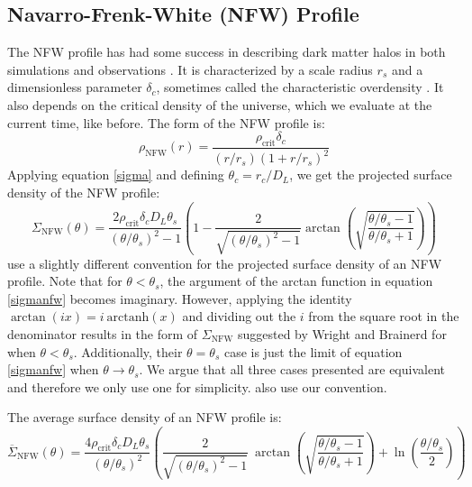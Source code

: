 \documentclass[10pt]{article}
\begin{document}
\subsection{Navarro-Frenk-White (NFW) Profile}
The NFW profile has had some success in describing dark matter halos in both simulations and observations \citep{Navarro1997}. It is characterized by a scale radius $r_s$ and a dimensionless parameter $\delta_c$, sometimes called the characteristic overdensity \citep{Wright2000}. It also depends on the critical density of the universe, which we evaluate at the current time, like before. The form of the NFW profile is:
\begin{equation}
\rho_\mathrm{NFW}(r) = \frac{\rho_\mathrm{crit} \delta_c}{(r/r_s)\left(1 + r/r_s\right)^2}
\end{equation}
Applying equation \ref{sigma} and defining $\theta_c = r_c/D_L$, we get the projected surface density of the NFW profile:
\begin{equation} \label{sigmanfw}
\Sigma_\mathrm{NFW}(\theta) = \frac{2 \rho_\mathrm{crit} \delta_c D_L \theta_s}{(\theta/\theta_s)^2 - 1} \left(1 - \frac{2}{\sqrt{(\theta/\theta_s)^2 - 1}} \arctan\left(\sqrt{\frac{\theta/\theta_s - 1}{\theta/\theta_s + 1}} \right) \right)
\end{equation}
\citet{Wright2000} use a slightly different convention for the projected surface density of an NFW profile. Note that for $\theta < \theta_s$, the argument of the arctan function in equation \ref{sigmanfw} becomes imaginary. However, applying the identity $\arctan(i x) = i\ \mathrm{arctanh}(x)$ and dividing out the $i$ from the square root in the denominator results in the form of $\Sigma_\mathrm{NFW}$ suggested by Wright and Brainerd for when  $\theta < \theta_s$. Additionally, their $\theta = \theta_s$ case is just the limit of equation \ref{sigmanfw} when $\theta \rightarrow \theta_s$. We argue that all three cases presented are equivalent and therefore we only use one for simplicity. \citet{Bartelmann2001} also use our convention.

The average surface density of an NFW profile is:
\begin{equation} \label{sigmabarnfw}
\overline{\Sigma}_\mathrm{NFW}(\theta) = \frac{4 \rho_\mathrm{crit} \delta_c D_L \theta_s}{(\theta/\theta_s)^2} \left(
    \frac{2}{\sqrt{(\theta/\theta_s)^2 - 1}} ~\arctan\left(\sqrt{\frac{\theta/\theta_s - 1}{\theta/\theta_s + 1}} \right) + \ln{\left(\frac{\theta/\theta_s}{2}\right)}
\right)
\end{equation}
\end{document}
